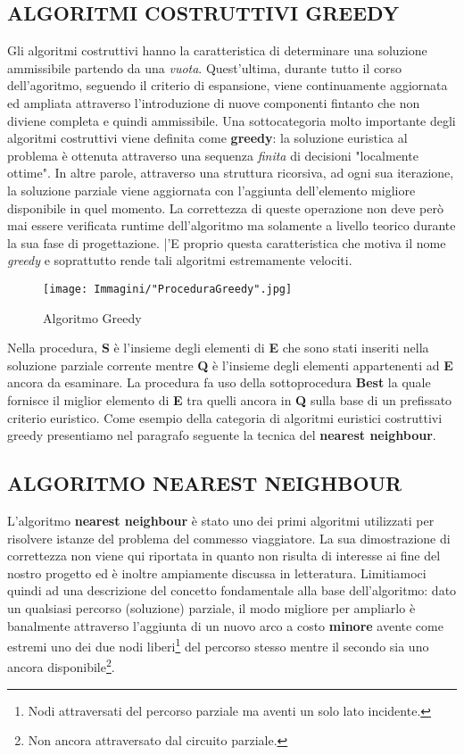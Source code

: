 \documentclass[11pt]{article}
\begin{document}
\subsection*{ALGORITMI COSTRUTTIVI GREEDY}

Gli algoritmi costruttivi hanno la caratteristica di determinare una soluzione ammissibile partendo da una \textit{vuota}. Quest'ultima, durante tutto il corso dell'agoritmo, seguendo il criterio di espansione, viene continuamente aggiornata ed ampliata attraverso l'introduzione di nuove componenti fintanto che non diviene completa e quindi ammissibile.
Una sottocategoria molto importante degli algoritmi costruttivi viene definita come \textbf{greedy}: la soluzione euristica al problema è ottenuta attraverso una sequenza \textit{finita} di decisioni "localmente ottime". In altre parole, attraverso una struttura ricorsiva, ad ogni sua iterazione, la soluzione parziale viene aggiornata con l'aggiunta dell'elemento migliore disponibile in quel momento. La correttezza di queste operazione non deve però mai essere verificata runtime dell'algoritmo ma solamente a livello teorico durante la sua fase di progettazione. |'E proprio questa caratteristica che motiva il nome \textit{greedy} e soprattutto rende tali algoritmi estremamente velociti.

\begin{figure}[htbp]
    \centering
    \texttt{[image: Immagini/"ProceduraGreedy".jpg]}
    \caption{Algoritmo Greedy}
\end{figure}

Nella procedura, \textbf{S} è l'insieme degli elementi di \textbf{E} che sono stati inseriti nella soluzione parziale corrente mentre \textbf{Q} è l'insieme degli elementi appartenenti ad \textbf{E} ancora da esaminare.
La procedura fa uso della sottoprocedura \textbf{Best} la quale fornisce il miglior elemento di \textbf{E} tra quelli ancora in \textbf{Q} sulla base di un prefissato criterio euristico.
Come esempio della categoria di algoritmi euristici costruttivi greedy presentiamo nel paragrafo seguente la tecnica del \textbf{nearest neighbour}.

\subsection*{ALGORITMO NEAREST NEIGHBOUR}

L'algoritmo \textbf{nearest neighbour} è stato uno dei primi algoritmi utilizzati per risolvere istanze del problema del commesso viaggiatore. La sua dimostrazione di correttezza non viene qui riportata in quanto non risulta di interesse ai fine del nostro progetto ed è inoltre ampiamente discussa in letteratura. Limitiamoci quindi ad una descrizione del concetto fondamentale alla base dell'algoritmo: dato un qualsiasi percorso (soluzione) parziale, il modo migliore per ampliarlo è banalmente attraverso l'aggiunta di un nuovo arco a costo \textbf{minore} avente come estremi uno dei due nodi liberi\footnote{Nodi attraversati del percorso parziale ma aventi un solo lato incidente.} del percorso stesso mentre il secondo sia uno ancora disponibile\footnote{Non ancora attraversato dal circuito parziale.}.
\end{document}

